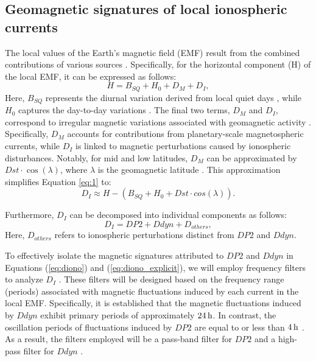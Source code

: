 \documentclass[a4paper,fleqn]{cas-dc}
\begin{document}
\subsection{Geomagnetic signatures of local ionospheric currents}
\label{diono}

The local values of the Earth's magnetic field (EMF) result from the combined contributions of various sources \citep{1969intro_to_iono_p, l_handbook_geof_sw_Geom_field, baseline_Gjerloev, vanKampt}. Specifically, for the horizontal component (H) of the local EMF, it can be expressed as follows:
\begin{equation}
    \label{eq:1}
    H = B_{SQ} + H_0 + D_{M} + D_{I},
\end{equation}
Here, $B_{SQ}$ represents the diurnal variation derived from local quiet days \citep{vanKampt}, while $H_0$ captures the day-to-day variations \citep{baseline_Gjerloev}. The final two terms, $D_{M}$ and $D_{I}$, correspond to irregular magnetic variations associated with geomagnetic activity \cite{ddyn2005, angeoddyn}. Specifically, $D_{M}$ accounts for contributions from planetary-scale magnetospheric currents, while $D_{I}$ is linked to magnetic perturbations caused by ionospheric disturbances. Notably, for mid and low latitudes, $D_{M}$ can be approximated by $Dst \cdot \cos(\lambda)$, where $\lambda$ is the geomagnetic latitude \citep{amorymazaudier_2017}. This approximation simplifies Equation \ref{eq:1} to:
\begin{equation}
\label{eq:diono}
   D_{I} \approx H -(B_{SQ} +  H_0 + Dst \cdot cos(\lambda)).
\end{equation}

Furthermore, $D_{I}$ can be decomposed into individual components as follows:
\begin{equation}
\label{eq:diono_explicit}
   D_{I} = DP2 + Ddyn + D_{others},
\end{equation}
Here, $D_{others}$ refers to ionospheric perturbations distinct from $DP2$ and $Ddyn.$

To effectively isolate the magnetic signatures attributed to $DP2$ and $Ddyn$ in Equations (\ref{eq:diono}) and (\ref{eq:diono_explicit}), we will employ frequency filters to analyze $D_{I}$ \citep{amory2020_filtros}. These filters will be designed based on the frequency range (periods) associated with magnetic fluctuations induced by each current in the local EMF. Specifically, it is established that the magnetic fluctuations induced by $Ddyn$ exhibit primary periods of approximately $24\, {\rm h}$. In contrast, the oscillation periods of fluctuations induced by $DP2$ are equal to or less than $4\, {\rm h}$ \cite{blanc_ddyn, angeoddyn}. As a result, the filters employed will be a pass-band filter for $DP2$ and a high-pass filter for $Ddyn$ \citep{nishida_68_fluctuations, blanc_ddyn}.
\end{document}

